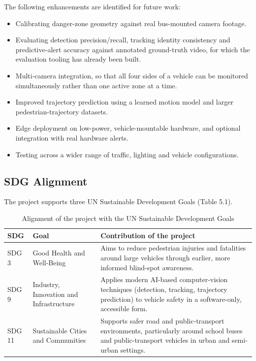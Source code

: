 \documentclass[12pt,a4paper]{report}
\begin{document}
The following enhancements are identified for future work:
\begin{itemize}[leftmargin=*,itemsep=2pt]
\item Calibrating danger-zone geometry against real bus-mounted camera footage.
\item Evaluating detection precision/recall, tracking identity consistency and predictive-alert accuracy against annotated ground-truth video, for which the evaluation tooling has already been built.
\item Multi-camera integration, so that all four sides of a vehicle can be monitored simultaneously rather than one active zone at a time.
\item Improved trajectory prediction using a learned motion model and larger pedestrian-trajectory datasets.
\item Edge deployment on low-power, vehicle-mountable hardware, and optional integration with real hardware alerts.
\item Testing across a wider range of traffic, lighting and vehicle configurations.
\end{itemize}

\begin{samepage}
\section{SDG Alignment}
The project supports three UN Sustainable Development Goals (Table 5.1).

\begin{table}[H]
\centering
\begin{tabular}{|p{0.7in}|p{1.6in}|p{3.0in}|}
\hline
\textbf{SDG} & \textbf{Goal} & \textbf{Contribution of the project} \\ \hline
SDG 3 & Good Health and Well-Being & Aims to reduce pedestrian injuries and fatalities around large vehicles through earlier, more informed blind-spot awareness. \\ \hline
SDG 9 & Industry, Innovation and Infrastructure & Applies modern AI-based computer-vision techniques (detection, tracking, trajectory prediction) to vehicle safety in a software-only, accessible form. \\ \hline
SDG 11 & Sustainable Cities and Communities & Supports safer road and public-transport environments, particularly around school buses and public-transport vehicles in urban and semi-urban settings. \\ \hline
\end{tabular}
\caption{Alignment of the project with the UN Sustainable Development Goals}
\label{tab:5.1}
\end{table}
\end{samepage}
\end{document}

